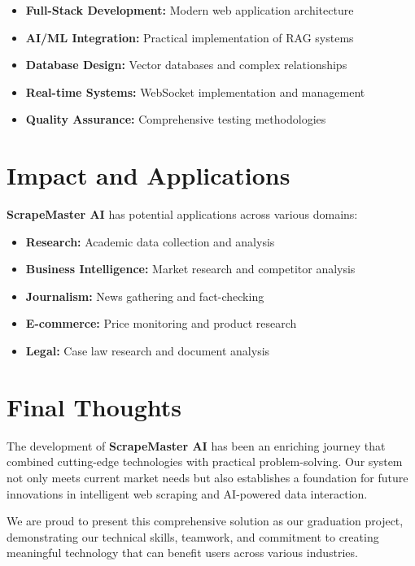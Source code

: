 \documentclass[12pt,a4paper]{report}
\begin{document}
\begin{itemize}
    \item \textbf{Full-Stack Development:} Modern web application architecture
    \item \textbf{AI/ML Integration:} Practical implementation of RAG systems
    \item \textbf{Database Design:} Vector databases and complex relationships
    \item \textbf{Real-time Systems:} WebSocket implementation and management
    \item \textbf{Quality Assurance:} Comprehensive testing methodologies
\end{itemize}

\section{Impact and Applications}

\textbf{ScrapeMaster AI} has potential applications across various domains:

\begin{itemize}
    \item \textbf{Research:} Academic data collection and analysis
    \item \textbf{Business Intelligence:} Market research and competitor analysis
    \item \textbf{Journalism:} News gathering and fact-checking
    \item \textbf{E-commerce:} Price monitoring and product research
    \item \textbf{Legal:} Case law research and document analysis
\end{itemize}

\section{Final Thoughts}

The development of \textbf{ScrapeMaster AI} has been an enriching journey that combined cutting-edge technologies with practical problem-solving. Our system not only meets current market needs but also establishes a foundation for future innovations in intelligent web scraping and AI-powered data interaction.

We are proud to present this comprehensive solution as our graduation project, demonstrating our technical skills, teamwork, and commitment to creating meaningful technology that can benefit users across various industries.
\end{document}
